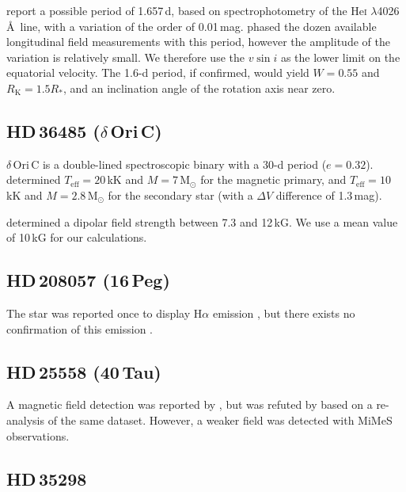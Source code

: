 \documentclass[useAMS,usenatbib]{mn2e}
\newcommand{\rk}{R_\mathrm{K}}
\newcommand{\rs}{R_\ast}
\newcommand{\vsini}{v \sin i}
\begin{document}
\citet{1979A&AS...35..313P} report a possible period of 1.657\,d, based on spectrophotometry of the He\textsc{i} $\lambda$4026\,\AA\ line, with a variation of the order of 0.01\,mag. \citet{2005A&A...430.1143B} phased the dozen available longitudinal field measurements with this period, however the amplitude of the variation is relatively small. We therefore use the $\vsini$ as the lower limit on the equatorial velocity. The 1.6-d period, if confirmed, would yield $W=0.55$ and $\rk=1.5\rs$, and an inclination angle of the rotation axis near zero.

\setcounter{subsection}{48}
\subsection{HD\,36485 ($\delta$\,Ori\,C)}	
	
$\delta$\,Ori\,C is a double-lined spectroscopic binary with a 30-d period ($e=0.32$). \citet{2010MNRAS.401.2739L} determined $T_\mathrm{eff}=20$\,kK and $M=7$\,M$_\odot$ for the magnetic primary, and $T_\mathrm{eff}=10$\,kK and $M=2.8$\,M$_\odot$ for the secondary star (with a $\Delta V$ difference of 1.3\,mag). 

\citet{2010MNRAS.401.2739L} determined a dipolar field strength between 7.3 and 12\,kG. We use a mean value of 10\,kG for our calculations. 

\setcounter{subsection}{49}
\subsection{HD\,208057 (16\,Peg)}

The star was reported once to display H$\alpha$ emission \citep{1943ApJ....98..153M}, but there exists no confirmation of this emission \citep{2009IAUS..259..393H}. 

\setcounter{subsection}{51}
\subsection{HD\,25558 (40\,Tau)}

A magnetic field detection was reported by \citet{2009AN....330..317H}, but was refuted by \citet{2012A&A...538A.129B} based on a re-analysis of the same dataset. However, a weaker field was detected with MiMeS observations.

\setcounter{subsection}{52}
\subsection{HD\,35298}
\end{document}
